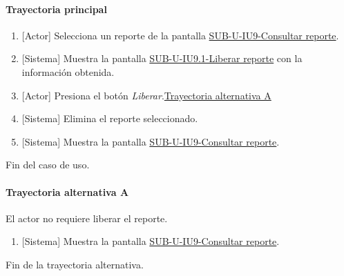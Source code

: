 \paragraph{Trayectoria principal}
	\begin{enumerate}
		\item {[Actor]} Selecciona un reporte de la pantalla \hyperref[fig:sub-u-iu9]{SUB-U-IU9-Consultar reporte}.
		\item {[Sistema]} Muestra la pantalla \hyperref[fig:sub-u-iu9.1]{SUB-U-IU9.1-Liberar reporte} con la información obtenida.
		\item {[Actor]} Presiona el botón \textit{Liberar}.\hyperref[SUB-U-CU9.1:TA]{Trayectoria alternativa A}
		\item {[Sistema]} Elimina el reporte seleccionado.
		\item {[Sistema]} Muestra la pantalla \hyperref[fig:sub-u-iu9]{SUB-U-IU9-Consultar reporte}.
	\end{enumerate}
	Fin del caso de uso.

\paragraph{Trayectoria alternativa A} \label{SUB-U-CU9.1:TA}
	El actor no requiere liberar el reporte.
	\begin{enumerate}[label=A\arabic*.]
		\item {[Sistema]} Muestra la pantalla \hyperref[fig:sub-u-iu9]{SUB-U-IU9-Consultar reporte}.
	\end{enumerate}
	Fin de la trayectoria alternativa.
